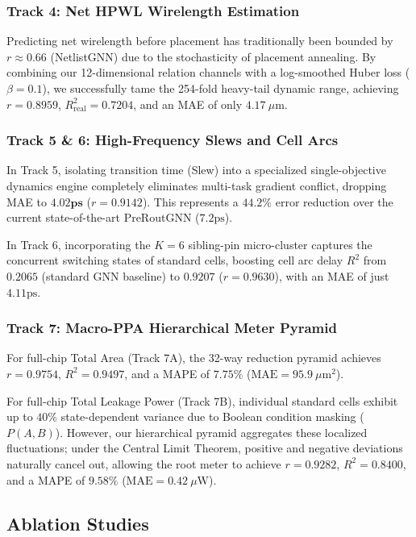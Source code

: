 \documentclass[conference]{IEEEtran}
\begin{document}
\subsubsection{Track 4: Net HPWL Wirelength Estimation}
Predicting net wirelength before placement has traditionally been bounded by $r \approx 0.66$ (NetlistGNN) due to the stochasticity of placement annealing. By combining our 12-dimensional relation channels with a log-smoothed Huber loss ($\beta = 0.1$), we successfully tame the 254-fold heavy-tail dynamic range, achieving $r = \mathbf{0.8959}$, $R^2_{\text{real}} = \mathbf{0.7204}$, and an MAE of only $4.17\ \mu\text{m}$.

\subsubsection{Track 5 \& 6: High-Frequency Slews and Cell Arcs}
In Track 5, isolating transition time (Slew) into a specialized single-objective dynamics engine completely eliminates multi-task gradient conflict, dropping MAE to $\mathbf{4.02\text{ps}}$ ($r = 0.9142$). This represents a $44.2\%$ error reduction over the current state-of-the-art PreRoutGNN ($7.2\text{ps}$). 

In Track 6, incorporating the $K=6$ sibling-pin micro-cluster captures the concurrent switching states of standard cells, boosting cell arc delay $R^2$ from $0.2065$ (standard GNN baseline) to $\mathbf{0.9207}$ ($r = 0.9630$), with an MAE of just $4.11\text{ps}$.

\subsubsection{Track 7: Macro-PPA Hierarchical Meter Pyramid}
For full-chip Total Area (Track 7A), the 32-way reduction pyramid achieves $r = 0.9754$, $R^2 = 0.9497$, and a MAPE of $7.75\%$ ($\text{MAE} = 95.9\ \mu\text{m}^2$). 

For full-chip Total Leakage Power (Track 7B), individual standard cells exhibit up to $40\%$ state-dependent variance due to Boolean condition masking ($P(A, B)$). However, our hierarchical pyramid aggregates these localized fluctuations; under the Central Limit Theorem, positive and negative deviations naturally cancel out, allowing the root meter to achieve $r = \mathbf{0.9282}$, $R^2 = \mathbf{0.8400}$, and a MAPE of $\mathbf{9.58\%}$ ($\text{MAE} = 0.42\ \mu\text{W}$).

\subsection{Ablation Studies}
\end{document}
